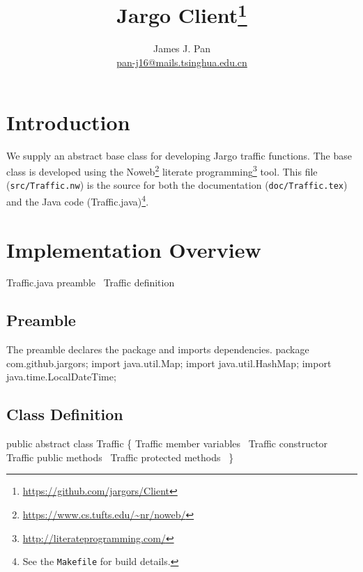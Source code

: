 \documentclass{article}
\title{Jargo Client\footnote{
    \url{https://github.com/jargors/Client}}}
\author{James J. Pan\\
  \small{\href{mailto:pan-j16@mails.tsinghua.edu.cn}{pan-j16@mails.tsinghua.edu.cn}}}
\def\nwendcode{\endtrivlist \endgroup}      %
\let\nwdocspar=\par
\begin{document}
\maketitle
\pagestyle{noweb}

\tableofcontents

\section{Introduction}
\label{sec:introduction}
We supply an abstract base class for developing Jargo traffic functions.  The
base class is developed using the
Noweb\footnote{\url{https://www.cs.tufts.edu/~nr/noweb/}} literate
programming\footnote{\url{http://literateprogramming.com/}} tool.  This file
({\tt{}src/Traffic.nw}) is the source for both the documentation
({\tt{}doc/Traffic.tex}) and the Java code (Traffic.java)\footnote{See the
{\tt{}Makefile} for build details.}.


\section{Implementation Overview}
\endmoddef{}
\LA{}Traffic.java preamble~{\nwtagstyle{}}\RA{}
\LA{}\code{}Traffic\edoc{} definition~{\nwtagstyle{}}\RA{}
\nwendcode{}\nwdocspar

\subsection{Preamble}
The preamble declares the package and imports dependencies.
\nwenddocs{}\endmoddef{}
package com.github.jargors;
import java.util.Map;
import java.util.HashMap;
import java.time.LocalDateTime;
\nwendcode{}\nwdocspar

\subsection{Class Definition}
\nwenddocs{}\endmoddef{}
public abstract class Traffic \{
  \LA{}\code{}Traffic\edoc{} member variables~{\nwtagstyle{}}\RA{}
  \LA{}\code{}Traffic\edoc{} constructor~{\nwtagstyle{}}\RA{}
  \LA{}\code{}Traffic\edoc{} public methods~{\nwtagstyle{}}\RA{}
  \LA{}\code{}Traffic\edoc{} protected methods~{\nwtagstyle{}}\RA{}
\}
\nwendcode{}\nwdocspar
\end{document}
